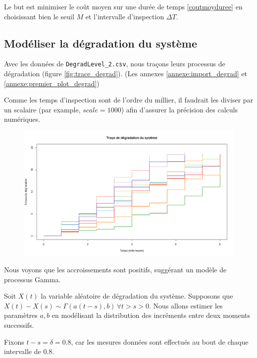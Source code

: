 \documentclass[10pt,a4paper]{article}
\begin{document}
Le but est minimiser le coût moyen sur une durée de temps \eqref{coutmoyduree} en choisissant bien le seuil $M$ et l'intervalle d'inspection $\Delta T$.
\subsection{Modéliser la dégradation du système}

Avec les données de \texttt{DegradLevel\_2.csv}, nous traçons leurs processus de dégradation (figure \eqref{fig:trace_degrad}). (Les annexes \eqref{annexe:import_degrad} et \eqref{annexe:premier_plot_degrad})

Comme les temps d'inspection sont de l'ordre du millier, il faudrait les diviser par un scalaire (par example, $scale = 1000$) afin d'assurer la précision des calculs numériques.

\begin{figure}
    \centering
    \includegraphics[width=\textwidth]{img/trace_degrad.png}
    \label{fig:trace_degrad}
\end{figure}

Nous voyons que les accroissements sont positifs, suggérant un modèle de processus Gamma.

Soit $X(t)$ la variable aléatoire de dégradation du système. Supposons que $X(t) - X(s) \sim \Gamma(a(t-s),b)\,\forall t > s > 0$. Nous allons estimer les paramètres $a,b$ en modélisant la distribution des incréments entre deux moments successifs.

Fixons $t-s = \delta = 0.8$, car les mesures données sont effectués au bout de chaque intervalle de $0.8$.
\end{document}
